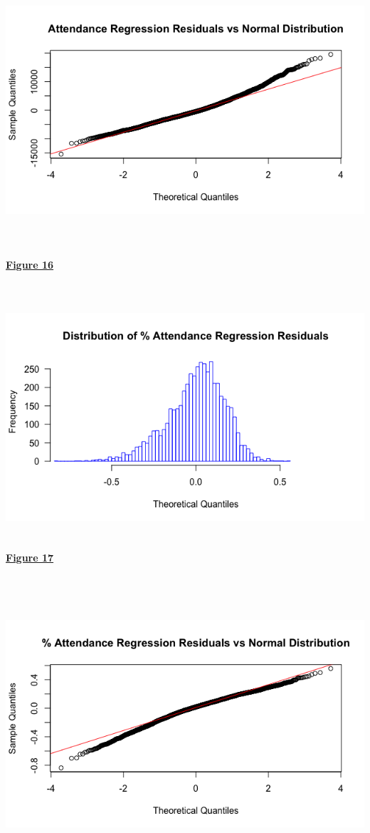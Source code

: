 \documentclass[preprint,12pt,times]{elsarticle}
\begin{document}
\includegraphics [width=\linewidth, height=10cm]{Picture15.png}
\newpage
\noindent
\begin{large}
\ul{\textbf{Figure 16}}
\end{large}\\

\includegraphics [width=\linewidth, height=9cm]{Picture17.png}
\begin{large}
\ul{\textbf{Figure 17}}
\end{large}\\

\includegraphics [width=\linewidth, height=10cm]{Picture18.png}
\newpage
\end{document}
